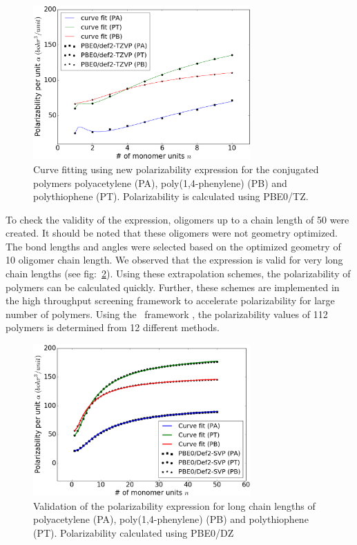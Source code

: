 \begin{figure}[htbp] 
	\centering
	\includegraphics[width=0.744\textwidth]{Chapter-3/Figures/Pol_fit_all_PBE0_TZ.eps}
	\caption{Curve fitting using new polarizability expression for the conjugated polymers polyacetylene (PA), poly(1,4-phenylene) (PB) and polythiophene (PT). Polarizability is calculated using PBE0/TZ.} 
	\label{fig:Pol_fit_all_PBE0_TZ} 
\end{figure}  


To check the validity of the expression, oligomers up to a chain length of 50 were created. It should be noted that these oligomers were not geometry optimized. The bond lengths and angles were selected based on the optimized geometry of 10 oligomer chain length. We observed that the expression is valid for very long chain lengths (see fig:\ \ref{fig:Pol_fit_all_long_PBE0_DZ}). Using these extrapolation schemes, the polarizability of polymers can be calculated quickly. Further, these schemes are implemented in the high throughput screening framework to accelerate polarizability for large number of polymers. Using the \chemhtps\ framework \cite{Afzal2018c}, the polarizability values of 112 polymers is determined from 12 different methods.

\begin{figure}[htbp] 
	\centering
	\includegraphics[width=0.744\textwidth]{Chapter-3/Figures/Pol_fit_all_long_PBE0_DZ.eps}
	\caption{Validation of the polarizability expression for long chain lengths of polyacetylene (PA), poly(1,4-phenylene) (PB) and polythiophene (PT). Polarizability calculated using PBE0/DZ} 
	\label{fig:Pol_fit_all_long_PBE0_DZ} 
\end{figure}  

